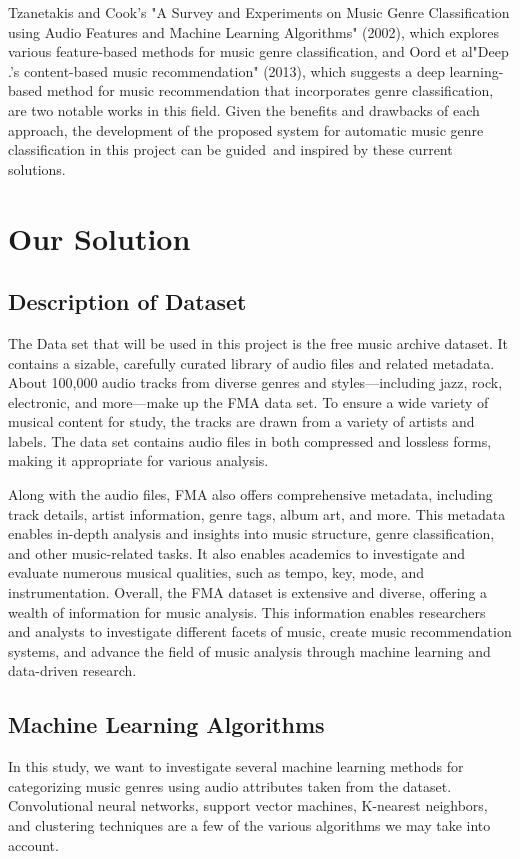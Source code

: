 \documentclass[conference]{IEEEtran}
\begin{document}
Tzanetakis and Cook's "A Survey and Experiments on Music Genre Classification using Audio Features and Machine Learning Algorithms" (2002), which explores various feature-based methods for music genre classification, and Oord et al"Deep .'s content-based music recommendation" (2013), which suggests a deep learning-based method for music recommendation that incorporates genre classification, are two notable works in this field. Given the benefits and drawbacks of each approach, the development of the proposed system for automatic music genre classification in this project can be guided and inspired by these current solutions.
\section{Our Solution}

\subsection{Description of Dataset}
The Data set that will be used in this project is the free music archive dataset. It contains a sizable, carefully curated library of audio files and related metadata. About 100,000 audio tracks from diverse genres and styles—including jazz, rock, electronic, and more—make up the FMA data set. To ensure a wide variety of musical content for study, the tracks are drawn from a variety of artists and labels. The data set contains audio files in both compressed and lossless forms, making it appropriate for various analysis.

Along with the audio files, FMA also offers comprehensive metadata, including track details, artist information, genre tags, album art, and more. This metadata enables in-depth analysis and insights into music structure, genre classification, and other music-related tasks. It also enables academics to investigate and evaluate numerous musical qualities, such as tempo, key, mode, and instrumentation. Overall, the FMA dataset is extensive and diverse, offering a wealth of information for music analysis. This information enables researchers and analysts to investigate different facets of music, create music recommendation systems, and advance the field of music analysis through machine learning and data-driven research.

\subsection{Machine Learning Algorithms}
In this study, we want to investigate several machine learning methods for categorizing music genres using audio attributes taken from the dataset. Convolutional neural networks, support vector machines, K-nearest neighbors, and clustering techniques are a few of the various algorithms we may take into account.
\end{document}
